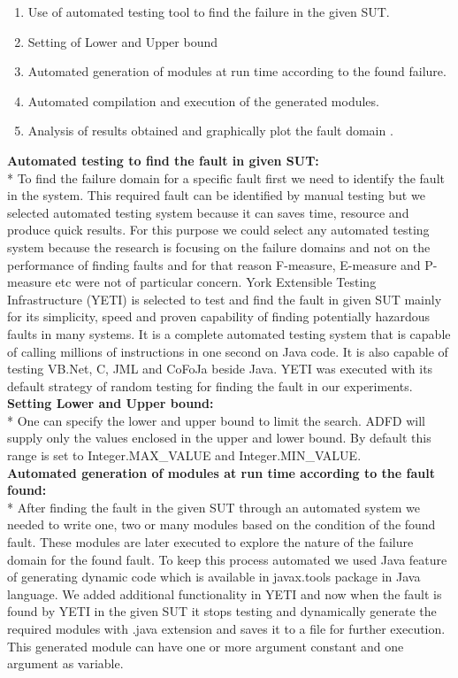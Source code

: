 \documentclass{acm_proc_article-sp}
\begin{document}
\begin{enumerate}
\item Use of automated testing tool to find the failure in the given SUT.
\item Setting of Lower and Upper bound
\item Automated generation of modules at run time according to the found failure.
\item Automated compilation and execution of the generated modules.
\item Analysis of results obtained and graphically plot the fault domain .\\
\end{enumerate}

\noindent \textbf{Automated testing to find the fault in given SUT:}\\*
\indent To find the failure domain for a specific fault first we need to identify the fault in the system. This required fault can be identified by manual testing but we selected automated testing system because it can saves time, resource and produce quick results. For this purpose we could select any automated testing system because the research is focusing on the failure domains and not on the performance of finding faults and for that reason F-measure, E-measure and P-measure etc were not of particular concern. York Extensible Testing Infrastructure (YETI) is selected to test and find the fault in given SUT mainly for its simplicity, speed and proven capability of finding potentially hazardous faults in many systems. It is a complete automated testing system that is capable of calling millions of instructions in one second on Java code. It is also capable of testing VB.Net, C, JML and CoFoJa beside Java. YETI was executed with its default strategy of random testing for finding the fault in our experiments.\\

\noindent \textbf{Setting Lower and Upper bound:}\\*
One can specify the lower and upper bound to limit the search. ADFD will supply only the values enclosed in the upper and lower bound. By default this range is set to Integer.MAX\_VALUE and Integer.MIN\_VALUE.\\

\noindent \textbf{Automated generation of modules at run time according to the fault found:}\\*
\indent After finding the fault in the given SUT through an automated system we needed to write one, two or many modules based on the condition of the found fault. These modules are later executed to explore the nature of the failure domain for the found fault. To keep this process automated we used Java feature of generating dynamic code which is available in javax.tools package in Java language. We added additional functionality in YETI and now when the fault is found by YETI in the given SUT it stops testing and dynamically generate the required modules with .java extension and saves it to a file for further execution. This generated module can have one or more argument constant and one argument as variable.\\
\end{document}
